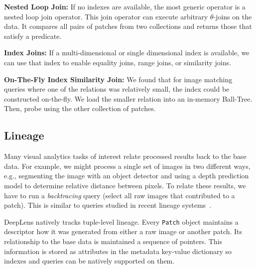 \vspace{0.25em}
\noindent \textbf{Nested Loop Join: } If no indexes are available, the most generic operator is a nested loop join operator. This join operator can execute arbitrary $\theta$-joins on the data.
It compares all pairs of patches from two collections and returns those that satisfy a predicate.

\vspace{0.25em}
\noindent \textbf{Index Joins: } If a multi-dimensional or single dimensional index is available, we can use that index to enable equality joins, range joins, or similarity joins.

\vspace{0.25em}
\noindent \textbf{On-The-Fly Index Similarity Join: } We found that for image matching queries where one of the relations was relatively small, the index could be constructed on-the-fly.
We load the smaller relation into an in-memory Ball-Tree. Then, probe using the other collection of patches.

\subsection{Lineage}
Many visual analytics tasks of interest relate processed results back to the base data.
For example, we might process a single set of images in two different ways, e.g., segmenting the image with an object detector and using a depth prediction model to determine relative distance between pixels.
To relate these results, we have to run a \emph{backtracing} query (select all raw images that contributed to a patch).
This is similar to queries studied in recent lineage systems~\cite{psallidas2018smoke}. 

\textsf{DeepLens} natively tracks tuple-level lineage.
Every \texttt{Patch} object maintains a descriptor how it was generated from either a raw image or another patch.
Its relationship to the base data is maintained a sequence of pointers.
This information is stored as attributes in the metadata key-value dictionary so indexes and queries can be natively supported on them.

